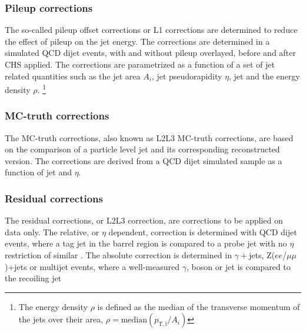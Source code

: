 \subsubsection*{Pileup corrections}
\noindent\justify
The so-called pileup offset corrections or L1 corrections are determined to reduce the effect of pileup on the jet energy. 
The corrections are determined in a simulated QCD dijet events, with and without pileup overlayed, before and after CHS applied. 
The corrections are parametrized as a function of a set of jet related quantities such as the jet area $A_{i}$, jet pseudorapidity $\eta$, jet \pt and the energy density $\rho$. \footnote{The energy density $\rho$ is defined as the median of the transverse momentum of the jets over their area, $\rho=\mathrm{median}(p_{\mathrm{T,i}}/ A_{i})$ } 
\subsubsection*{MC-truth corrections} 
\noindent\justify
The MC-truth corrections, also known as L2L3 MC-truth corrections, are based on the comparison of a particle level jet and its corresponding reconstructed version. 
The corrections are derived from a QCD dijet simulated sample as a function of jet \pt and $\eta$. 
\subsubsection*{Residual corrections}
\noindent\justify
The residual corrections, or L2L3 correction, are corrections to be applied on data only. 
The relative, or $\eta$ dependent, correction is determined with QCD dijet events, where a tag jet in the barrel region is compared to a probe jet with no $\eta$ restriction of similar \pt. 
The absolute correction is determined in $\gamma+$jets, Z($ee$/$\mu\mu$)+jets or multijet events, where a well-measured $\gamma$, \PZ boson or jet is compared to the recoiling jet 

